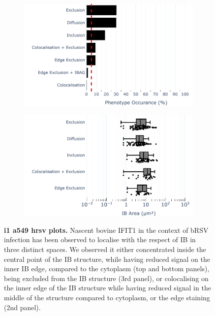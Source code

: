 \begin{figure}
    \begin{subfigure}{0.5\textwidth}
        \caption{}
        \includegraphics[width=1\linewidth]{09. Chapter 4/Figs/02. Infection/01. IFIT1/01. bar_i1_a549.pdf} 
    \end{subfigure}
    \begin{subfigure}{0.5\textwidth}
        \caption{}
        \includegraphics[width=1\linewidth]{09. Chapter 4/Figs/02. Infection/01. IFIT1/02. box_i1_a549.pdf}
    \end{subfigure}
    \caption[i1 a549 hrsv plots]{\textbf{i1 a549 hrsv plots.} Nascent bovine IFIT1 in the context of bRSV infection has been observed to localise with the respect of IB in three distinct spaces. We observed it either concentrated inside the central point of the IB structure, while having reduced signal on the inner IB edge, compared to the cytoplasm (top and bottom panels), being excluded from the IB structure (3rd panel), or colocalising on the inner edge of the IB structure while having reduced signal in the middle of the structure compared to cytoplasm, or the edge staining (2nd panel).}
    \label{fig:i1 a549 hrsv plots}
\end{figure}


